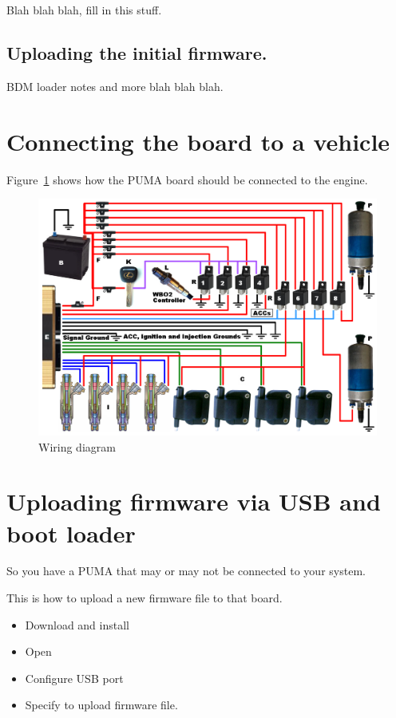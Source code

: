 \documentclass[12pt,a4paper,titlepage]{article}
\begin{document}
Blah blah blah, fill in this stuff.

\subsection{Uploading the initial firmware.}

BDM loader notes and more blah blah blah. 


\section{Connecting the board to a vehicle}

Figure~\ref{fig:wiring} shows how the PUMA board should be connected to the engine.

\begin{figure}[htb]
\begin{center}
\includegraphics[width=1\textwidth]{images/freeems-power-wiring5.png}
\caption{Wiring diagram}
\label{fig:wiring}
\end{center}
\end{figure}

\section{Uploading firmware via USB and boot loader}

So you have a PUMA that may or may not be connected to your system.

This is how to upload a new firmware file to that board.

\begin{itemize}
\item Download and install 

\item Open

\item Configure USB port

\item Specify to upload firmware file.
\end{itemize}
\end{document}
